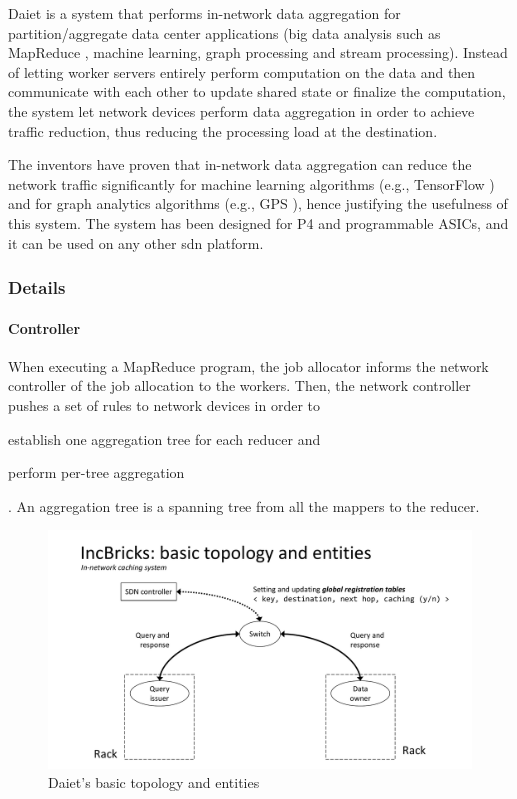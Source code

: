 Daiet \cite{daiet} is a system that performs in-network data aggregation for partition/aggregate data center applications (big data analysis such as MapReduce \cite{mapreduce}, machine learning, graph processing and stream processing).
Instead of letting worker servers entirely perform computation on the data and then communicate with each other to update shared state or finalize the computation, the system let network devices perform data aggregation in order to achieve traffic reduction, thus reducing the processing load at the destination.\par
The inventors have proven that in-network data aggregation can reduce the network traffic significantly for machine learning algorithms (e.g., TensorFlow \cite{tensorflow}) and for graph analytics algorithms (e.g., GPS \cite{gps}), hence justifying the usefulness of this system. The system has been designed for P4 \cite{p4} and programmable ASICs, and it can be used on any other \gls{sdn} platform.

\subsubsection{Details}
\paragraph{Controller}
When executing a MapReduce program, the job allocator informs the network controller of the job allocation to the workers.
Then, the network controller pushes a set of rules to network devices in order to
\begin{mylist}
    \item establish one aggregation tree for each reducer and
    \item perform per-tree aggregation
\end{mylist}.
An aggregation tree is a spanning tree from all the mappers to the reducer.

\begin{figure}[!htb]
    \centering
        \includegraphics[page=9, clip, trim=0.25cm 1.1cm 0.25cm 4.7cm, width=1.00\textwidth]{figures/analysis/inp/solutions.pdf}
    \caption{Daiet's \texorpdfstring{\cite{daiet}}{} basic topology and entities}
\end{figure}

